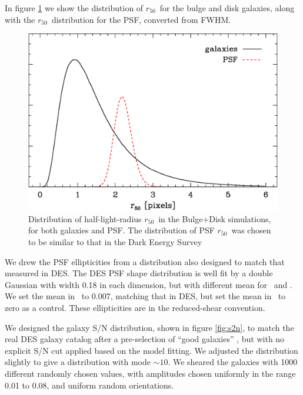 \documentclass[usegraphicx,usenatbib]{mn2e}
\newcommand{\hlr}{$r_{50}$}
\begin{document}
In figure \ref{fig:psimhlrcompare} we show the distribution of \hlr\ for the
bulge and disk galaxies, along with the \hlr\ distribution for the PSF,
converted from FWHM.

\begin{figure}
    \centering
    \includegraphics[scale=0.45]{sim-bd29-r50.eps}

    \caption{Distribution of half-light-radius \hlr\ in the Bulge+Disk simulations,
        for both galaxies and PSF.  The distribution of PSF \hlr\ 
        was chosen to be similar to that in the 
        Dark Energy Survey}

\label{fig:psimhlrcompare}
\end{figure}


We drew the PSF ellipticities from a distribution also designed to match that
measured in DES.  The DES PSF shape distribution is well fit by a double
Gaussian with width 0.18 in each dimension, but with different mean for \eone\
and \etwo.  We set the mean in \etwo\ to $0.007$, matching that in DES, but set
the mean in \eone\ to zero as a control.  These ellipticities are in the
reduced-shear convention.  

We designed the galaxy S/N distribution, shown in figure \ref{fig:s2n}, to
match the real DES galaxy catalog after a pre-selection of ``good galaxies''
\citep{DESSVShear}, but with no explicit S/N cut applied based on the model
fitting.  We adjusted the distribution slightly to give a distribution with
mode $\sim10$.  We sheared the galaxies with 1000 different randomly chosen values,
with amplitudes chosen uniformly in the range 0.01 to 0.08, and uniform random
orientations.
\end{document}
